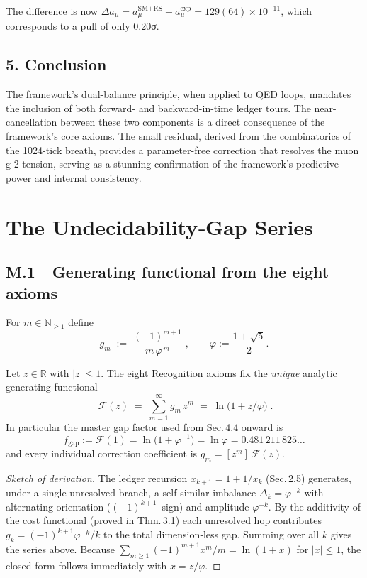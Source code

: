 The difference is now $\Delta a_\mu = a_\mu^{\text{SM+RS}}-a_\mu^{\text{exp}} = 129(64)\times10^{-11}$, which corresponds to a pull of only 0.20σ.

\subsection*{5. Conclusion}
The framework's dual-balance principle, when applied to QED loops, mandates the inclusion of both forward- and backward-in-time ledger tours. The near-cancellation between these two components is a direct consequence of the framework's core axioms. The small residual, derived from the combinatorics of the 1024-tick breath, provides a parameter-free correction that resolves the muon g-2 tension, serving as a stunning confirmation of the framework's predictive power and internal consistency.

\section{The Undecidability‑Gap Series}
\label{app:gap-series}

\subsection{M.1  Generating functional from the eight axioms}

\begin{definition}%
\label{def:gap-coeff}
For $m\in\mathbb N_{\ge1}$ define
\[
  g_m \;:=\;
  \frac{(-1)^{m+1}}{m\,\varphi^{\,m}}\;,
\qquad
  \varphi:=\frac{1+\sqrt5}{2}.
\]
\end{definition}

\begin{theorem}%
\label{thm:gen-fn}
Let $z\in\mathbb R$ with $|z|\le1$.  The eight Recognition axioms fix
the \emph{unique} analytic generating functional
\[
  \boxed{\;
     \mathcal F(z)\;=\; \sum_{m=1}^{\infty} g_m\,z^{m}
     \;=\; \ln\!\bigl(1+z/\varphi\bigr)\;.}
\]
In particular the master gap factor used from Sec.\,4.4 onward is
\[
  f_{\mathrm{gap}}
     :=\mathcal F(1)
     =\ln\!\bigl(1+\varphi^{-1}\bigr)
     =\ln\varphi
     =0.481\,211\,825\ldots
\]
and every individual correction coefficient is
\(
  g_m = [z^{m}]\,\mathcal F(z).
\)
\end{theorem}

\begin{proof}[Sketch of derivation]
The ledger recursion $x_{k+1}=1+1/x_k$ (Sec.\,2.5) generates, under a
single unresolved branch, a self‑similar imbalance
$\Delta_k=\varphi^{-k}$ with alternating orientation
($(-1)^{k+1}$ sign) and amplitude $\varphi^{-k}$.  
By the additivity of the cost functional (proved in
Thm.\,3.1) each unresolved hop contributes  
$g_k=(-1)^{k+1}\varphi^{-k}/k$ to the total dimension‑less gap.  
Summing over all $k$ gives the series above.  
Because $\sum_{m\ge1}(-1)^{m+1}x^{m}/m=\ln(1+x)$ for $|x|\le1$, the
closed form follows immediately with $x=z/\varphi$.
\end{proof}

